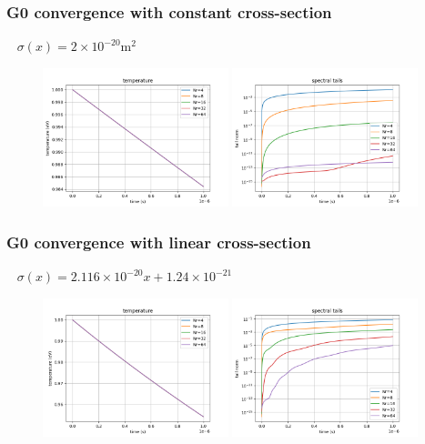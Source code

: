 \documentclass[mathserif, aspectratio=169]{beamer}
\begin{document}
	\begin{frame}
		\frametitle{G0 convergence with constant cross-section}
		\textbullet~  $\sigma(x) = 2\times 10^{-20} \mathrm{m}^{2}$
		\begin{figure}
			\includegraphics[width=0.48\textwidth]{g0_mw_m0_temp.png}
			\includegraphics[width=0.48\textwidth]{g0_mw_m0_tails.png}
		\end{figure}
	\end{frame}


	\begin{frame}
		\frametitle{G0 convergence with linear cross-section}
		\textbullet~ $\sigma(x) = 2.116 \times 10^{-20} x + 1.24\times 10^{-21}$
		\begin{figure}
			\includegraphics[width=0.48\textwidth]{g0_mw_m1_temp.png}
			\includegraphics[width=0.48\textwidth]{g0_mw_m1_tails.png}
		\end{figure}
	\end{frame}
	
\end{document}
